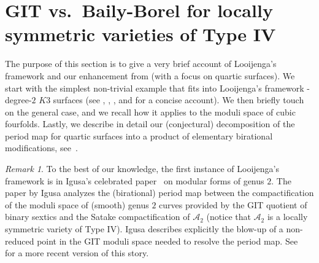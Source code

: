 \documentclass[11pt]{amsart}
\numberwithin{equation}{section}
\theoremstyle{plain}
\theoremstyle{remark}
\newtheorem{remark}[theorem]{Remark}
\theoremstyle{definition}
\newcommand{\cA}{{\mathscr A}}
\begin{document}

\section{GIT vs.~Baily-Borel  for locally symmetric varieties of Type IV}\label{sec:overview}
\setcounter{equation}{0}
%
The purpose of this section is to give a very brief account of Looijenga's framework and our enhancement from \cite{log1} (with a focus on quartic surfaces). We start with the simplest non-trivial example that fits into Looijenga's framework -  degree-$2$ $K3$ surfaces (see \cite{shah}, \cite{looijengavancouver}, \cite[\S5]{friedmanannals}, and \cite[\S1]{k3pairs} for a concise account). We then briefly touch on the general case,  and we recall how it applies   to the moduli space of cubic fourfolds. Lastly, we describe in detail our (conjectural) decomposition of the period map  for  quartic surfaces into a product of elementary birational modifications, see~\cite{log1}. 
%
\begin{remark}
%
To the best of our knowledge, the first instance of Looijenga's framework is in Igusa's celebrated paper~\cite{igusag2} on modular forms of genus $2$. The paper by Igusa analyzes the (birational) period map between the  compactification of the moduli space of (smooth) genus $2$ curves provided by the GIT quotient of binary sextics and the Satake compactification of $\cA_2$ (notice that $\cA_2$ is a locally symmetric variety of Type IV). Igusa describes explicitly the blow-up of a non-reduced point in the GIT moduli space needed to resolve the period map. See~\cite{hassg2} for a more recent version of this story.
%
\end{remark}
%
%
\end{document}
